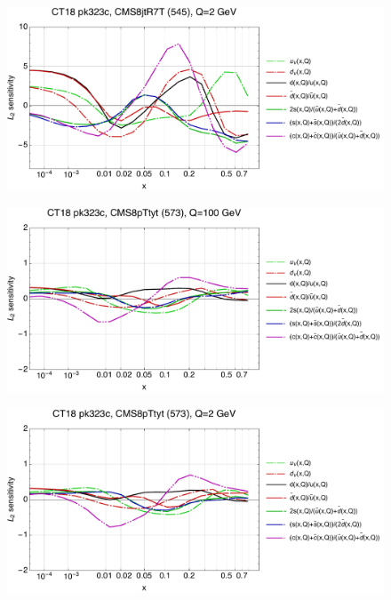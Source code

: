 \documentclass[10pt,aps,prd,floatfix,titlepage]{revtex4}
\begin{document}
\begin{figure}
\includegraphics[width=\textwidth,height=0.44\textheight,keepaspectratio]{2/545_ct18nn_q2_Sf_2.pdf}
\caption{}
\end{figure}
\clearpage
\begin{figure}
\includegraphics[width=\textwidth,height=0.44\textheight,keepaspectratio]{2/573_ct18nn_q100_Sf_2.pdf}
\caption{}
\end{figure}
\begin{figure}
\includegraphics[width=\textwidth,height=0.44\textheight,keepaspectratio]{2/573_ct18nn_q2_Sf_2.pdf}
\caption{}
\end{figure}
\end{document}
